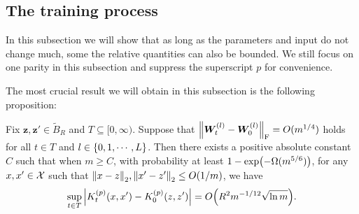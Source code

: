 \subsection{The training process}\label{subsec:Training}

In this subsection we will show that as long as the parameters and input do not change much, some the relative quantities can also be bounded.
We still focus on one parity in this subsection and suppress the superscript $p$ for convenience.

The most crucial result we will obtain in this subsection is the following proposition:
\begin{proposition}
  \label{prop:Training_KernelBound}

  Fix $ \bm{z},\bm{z}' \in \tilde{B}_R$ and $T\subseteq[0,\infty)$.
  Suppose that $\norm{\bm{W}^{(l)}_t - \bm{W}^{(l)}_0}_{\mathrm{F}}= O(m^{1/4})$ holds for all $t\in T$ and $l\in\left\{0,1,\cdots,L\right\}$.
  Then there exists a positive absolute constant $C$ such that when $m\geq C$, with probability at least $1 - \exp\xkm{-\Omega(m^{5/6})}$, for any $x,x' \in \mathcal{\bm{X}}$ such that $\norm{x-z}_2,\norm{x'-z'}_2 \leq O( 1/m)$, we have
  \[\sup_{t\in T}\abs{K^{(p)}_t(\x,\x') - K^{(p)}_0(\z,\z')}= O \xkm{R^2 m^{-{1}/{12}}\sqrt{\ln m}}.\]
\end{proposition}

